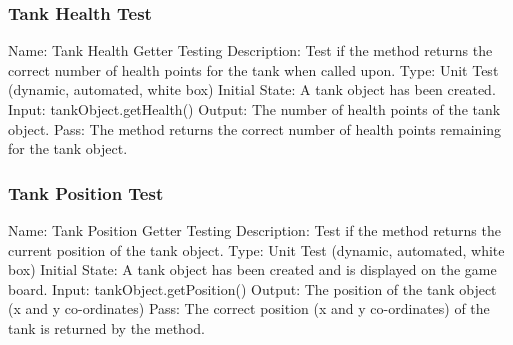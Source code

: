 \documentclass{article}
\begin{document}
\subsubsection{Tank Health Test}
Name: Tank Health Getter Testing\newline
Description: Test if the method returns the correct number of health points 
for the tank when called upon.\newline
Type: Unit Test (dynamic, automated, white box)\newline
Initial State: A tank object has been created.\newline
Input: tankObject.getHealth()\newline
Output: The number of health points of the tank object.\newline
Pass: The method returns the correct number of health points remaining for the 
tank object.\newline

\subsubsection{Tank Position Test}
Name: Tank Position Getter Testing\newline
Description: Test if the method returns the current position of the tank 
object.\newline
Type: Unit Test (dynamic, automated, white box)\newline
Initial State: A tank object has been created and is displayed on the game 
board.\newline
Input: tankObject.getPosition()\newline
Output: The position of the tank object (x and y co-ordinates)\newline
Pass: The correct position (x and y co-ordinates) of the tank is returned by 
the method.\newline




\end{document}
